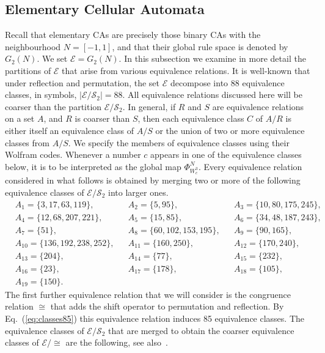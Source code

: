 \documentclass[a4paper]{article}
\begin{document}
\subsection{Elementary Cellular Automata}
Recall that elementary CAs are precisely those binary CAs with the neighbourhood $N = [-1,1]$,
and that their global rule space is denoted by $G_2(N)$.
We set $\mathcal{E} = G_2(N)$.
In this subsection we examine in more detail the partitions of $\mathcal{E}$ that arise from various equivalence relations.
It is well-known that under reflection and permutation,  the set $\mathcal{E}$ decompose into 88 equivalence classes,
in symbols, $|\mathcal{E} / \mathcal{S}_2| = 88$.
All equivalence relations discussed here will be coarser than the partition $\mathcal{E} / \mathcal{S}_2$.
In general, if $R$ and $S$ are equivalence relations on a set $A$, and $R$ is coarser than $S$,
then each equivalence class $C$ of $A / R$ is either itself an equivalence class of $A / S$ or the union of
two or more equivalence classes from $A / S$.
We specify the members of equivalence classes using their Wolfram codes.
Whenever a number $c$ appears in one of the equivalence classes below, it is to be interpreted as the global map $\Phi^{N}_{W^3_c}$.
Every equivalence relation considered in what follows is obtained by merging two or more of the following equivalence classes of
$\mathcal{E} / \mathcal{S}_2$ into larger ones.
\begin{align*}
& A_1 = \{3,17,63,119\}, & & A_2=\{5,95\}, & & A_3 = \{10,80,175,245\}, \\
& A_4 = \{12,68,207,221\}, & & A_5=\{15,85\}, & & A_6=\{34,48,187,243\}, \\
& A_7 = \{51\}, & & A_8=\{60,102,153,195\}, & & A_9 = \{90, 165\}, \\
& A_{10} = \{136, 192, 238, 252\}, & & A_{11}=\{160,250\}, & & A_{12}=\{170,240\}, \\
& A_{13}=\{204\}, & &  A_{14} = \{77\},  & & A_{15} = \{232 \}, \\
& A_{16} = \{ 23 \}, & & A_{17} = \{178\}, & & A_{18}=\{105\}, \\
& A_{19} = \{150\}. & & & &
\end{align*}
The first further equivalence relation that we will consider is the congruence relation $\cong$ that
adds the shift operator to permutation and reflection.
By Eq.~(\ref{eq:classes85}) this equivalence relation induces 85 equivalence classes.
The equivalence classes of $\mathcal{E} / \mathcal{S}_2$ that are merged to obtain the coarser equivalence classes of
$\mathcal{E} / {\cong}$ are the following, see also~\cite{RUIVO2018280}.
\end{document}
